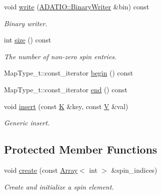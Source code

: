 \begin{DoxyCompactItemize}
void \mbox{\hyperlink{classHadron_1_1HadronDistOperatorRep__t_a13c4b6d851e65136c55ccee152e72a12}{write}} (\mbox{\hyperlink{classADATIO_1_1BinaryWriter}{A\+D\+A\+T\+I\+O\+::\+Binary\+Writer}} \&bin) const
\begin{DoxyCompactList}\small\item\em Binary writer. \end{DoxyCompactList}\item 
int \mbox{\hyperlink{classHadron_1_1HadronDistOperatorRep__t_aa29061d2a7319319dd6ea0a918acd8db}{size}} () const
\begin{DoxyCompactList}\small\item\em The number of non-\/zero spin entries. \end{DoxyCompactList}\item 
Map\+Type\+\_\+t\+::const\+\_\+iterator \mbox{\hyperlink{classHadron_1_1HadronDistOperatorRep__t_a77caca753b9c9b1d433898627e6bd3de}{begin}} () const
\item 
Map\+Type\+\_\+t\+::const\+\_\+iterator \mbox{\hyperlink{classHadron_1_1HadronDistOperatorRep__t_ae811537842e96e1161375ffe7dd65ca2}{end}} () const
\item 
void \mbox{\hyperlink{classHadron_1_1HadronDistOperatorRep__t_a05856fbd2f2205ddc461685d987713b9}{insert}} (const \mbox{\hyperlink{classHadron_1_1HadronDistOperatorRep__t_a670c7409bfd80616aeb0159590bcdb6b}{K}} \&key, const \mbox{\hyperlink{classHadron_1_1HadronDistOperatorRep__t_a40f37383ae57b1d0bbf944d698a10382}{V}} \&val)
\begin{DoxyCompactList}\small\item\em Generic insert. \end{DoxyCompactList}\end{DoxyCompactItemize}
\subsection*{Protected Member Functions}
\begin{DoxyCompactItemize}
\item 
void \mbox{\hyperlink{classHadron_1_1HadronDistOperatorRep__t_a5d71057f500ecb252c0d204434d45ccd}{create}} (const \mbox{\hyperlink{classXMLArray_1_1Array}{Array}}$<$ int $>$ \&spin\+\_\+indices)
\begin{DoxyCompactList}\small\item\em Create and initialize a spin element. \end{DoxyCompactList}\end{DoxyCompactItemize}


